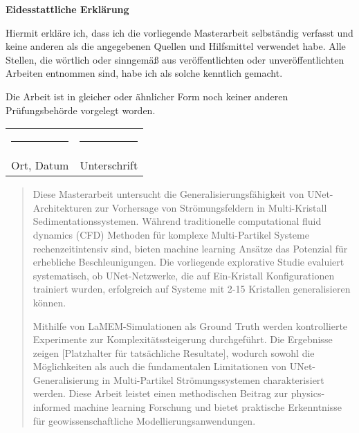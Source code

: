 \documentclass[12pt,twoside,openright]{scrreprt}
\theoremstyle{definition}
\theoremstyle{plain}
\begin{document}
\newpage
\thispagestyle{empty}
\mbox{}

\newpage
\thispagestyle{empty}

\vspace*{3cm}
\begin{center}
    {\Large \textbf{Eidesstattliche Erklärung}}
\end{center}

\vspace{2cm}

Hiermit erkläre ich, dass ich die vorliegende Masterarbeit selbständig verfasst und keine anderen als die angegebenen Quellen und Hilfsmittel verwendet habe. Alle Stellen, die wörtlich oder sinngemäß aus veröffentlichten oder unveröffentlichten Arbeiten entnommen sind, habe ich als solche kenntlich gemacht.

\vspace{1cm}

Die Arbeit ist in gleicher oder ähnlicher Form noch keiner anderen Prüfungsbehörde vorgelegt worden.

\vspace{3cm}

\noindent
\begin{tabular}{@{}p{7cm}p{7cm}@{}}
    \rule{6cm}{0.5pt} & \rule{6cm}{0.5pt} \\
    Ort, Datum & Unterschrift \\
\end{tabular}

\newpage
\begin{abstract}
Diese Masterarbeit untersucht die Generalisierungsfähigkeit von UNet-Architekturen zur Vorhersage von Strömungsfeldern in Multi-Kristall Sedimentationssystemen. Während traditionelle computational fluid dynamics (CFD) Methoden für komplexe Multi-Partikel Systeme rechenzeitintensiv sind, bieten machine learning Ansätze das Potenzial für erhebliche Beschleunigungen. Die vorliegende explorative Studie evaluiert systematisch, ob UNet-Netzwerke, die auf Ein-Kristall Konfigurationen trainiert wurden, erfolgreich auf Systeme mit 2-15 Kristallen generalisieren können. 

Mithilfe von LaMEM-Simulationen als Ground Truth werden kontrollierte Experimente zur Komplexitätssteigerung durchgeführt. Die Ergebnisse zeigen [Platzhalter für tatsächliche Resultate], wodurch sowohl die Möglichkeiten als auch die fundamentalen Limitationen von UNet-Generalisierung in Multi-Partikel Strömungssystemen charakterisiert werden. Diese Arbeit leistet einen methodischen Beitrag zur physics-informed machine learning Forschung und bietet praktische Erkenntnisse für geowissenschaftliche Modellierungsanwendungen.
\end{abstract}
\end{document}
